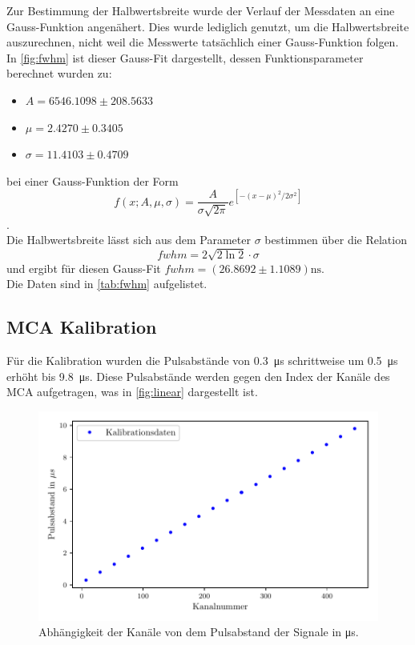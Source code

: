 Zur Bestimmung der Halbwertsbreite wurde der Verlauf der Messdaten an eine Gauss-Funktion angenähert.
Dies wurde lediglich genutzt, um die Halbwertsbreite auszurechnen, nicht weil die Messwerte tatsächlich einer Gauss-Funktion folgen.\\
In \autoref{fig:fwhm} ist dieser Gauss-Fit dargestellt, dessen Funktionsparameter berechnet wurden zu:
\begin{itemize}
    \item $A = 6546.1098 \pm 208.5633$
    \item $\mu = 2.4270 \pm 0.3405$
    \item $\sigma = 11.4103 \pm 0.4709$
\end{itemize}
bei einer Gauss-Funktion der Form
\begin{equation}
    f(x;A,\mu,\sigma) = \frac{A}{\sigma \sqrt{2\pi}}e^{\left[-\left(x - \mu\right)^2/{2\sigma^2}\right]}
\end{equation}.\\
Die Halbwertsbreite lässt sich aus dem Parameter $\sigma$ bestimmen über die Relation
\begin{equation}
    fwhm = 2\sqrt{2\ln2}\cdot \sigma
\end{equation}
und ergibt für diesen Gauss-Fit $fwhm = \left(26.8692\pm1.1089\right)\si{\nano\second}$.\\
Die Daten sind in \autoref{tab:fwhm} aufgelistet.

\subsection{MCA Kalibration}
\label{sec:calli}
Für die Kalibration wurden die Pulsabstände von \SI{0.3}{\micro\second} schrittweise um \SI{0.5}{\micro\second} erhöht bis \SI{9.8}{\micro\second}.
Diese Pulsabstände werden gegen den Index der Kanäle des MCA aufgetragen, was in \autoref{fig:linear} dargestellt ist.

\begin{figure}[H]
    \centering
    \includegraphics{images/linear.pdf}
    \caption{Abhängigkeit der Kanäle von dem Pulsabstand der Signale in \si[]{\micro\second}.}
    \label{fig:linear}
\end{figure}

